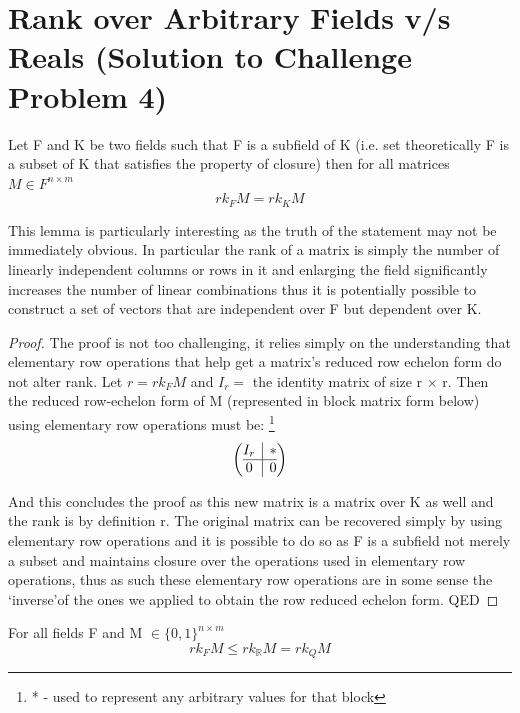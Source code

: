 \documentclass[usletter]{article}
\begin{document}
\section{Rank over Arbitrary Fields v/s Reals (Solution to Challenge Problem 4)}
\begin{lemma}
Let F and K be two fields such that F is a subfield of K (i.e. set theoretically F is a subset of K that satisfies the property of closure) then for all matrices $M \in F ^ {n \times m}$
$$ rk_{F} M = rk_{K} M $$

\end{lemma}

\noindent This lemma is particularly interesting as the truth of the statement may not be immediately obvious. In particular the rank of a matrix is simply the number of linearly independent columns or rows in it and enlarging the field significantly increases the number of linear combinations thus it is potentially possible to construct a set of vectors that are independent over F but dependent over K.
\begin{proof}
The proof is not too challenging, it relies simply on the understanding that elementary row operations that help get a matrix's reduced row echelon form do not alter rank. \newline
Let $r = rk_F M $ and $I_r = $ the identity matrix of size r $\times$ r. 
Then the reduced row-echelon form of M (represented in block matrix form below) using elementary row operations must be: \footnote {* - used to represent any arbitrary values for that block}
\[
\left(\begin{array}{@{}c|c@{}}
I_r & * \\
\hline
  0 & 0
\end{array}\right)
\]

And this concludes the proof as this new matrix is a matrix over K as well and the rank is by definition r. The original matrix can be recovered simply by using elementary row operations and it is possible to do so as F is a subfield not merely a subset and maintains closure over the operations used in elementary row operations, thus as such these elementary row operations are in some sense the  \lq inverse\rq of the ones we applied to obtain the row reduced echelon form. QED
\end{proof}

\begin{theorem}
For all fields F and M $\in \{ 0, 1\} ^ {n \times m}$
$$rk_F M \leq rk_{\mathbb{R}} M = rk_Q M $$
\end{theorem}
\end{document}
